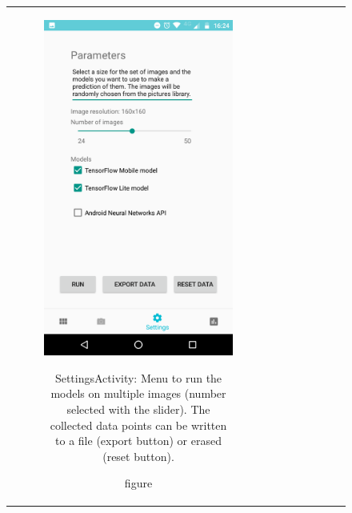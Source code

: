 \documentclass{article}
\begin{document}
\begin{figure}[!h]
\begin{tabular}[c]{cc}
    \begin{subfigure}[c]{0.4\textwidth}
      \includegraphics[width=\textwidth]{img/app/settings.png}
      \caption{figure}{\footnotesize SettingsActivity: Menu to run the models on multiple images (number selected with the slider). The collected data points can be written to a file (export button) or erased (reset button).}
      \label{fig:SettingsActivity}
    \end{subfigure}&
    \begin{subfigure}[c]{0.4\textwidth}

\end{subfigure}
\end{tabular}
\end{figure}
\end{document}
